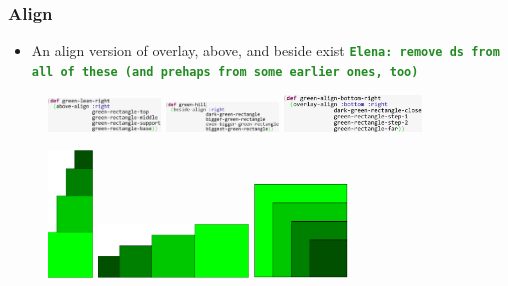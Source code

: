 \documentclass{beamer}
\newcommand{\comment}[1]{{\bf \tt  {#1}}}
\newcommand{\emcomment}[1]{\textcolor{ForestGreen}{\comment{Elena: {#1}}}}
\begin{document}
\begin{frame}
\frametitle{Align}
	\begin{itemize}
		\item An align version of overlay, above, and beside exist \emcomment{remove ds from all of these (and prehaps from some earlier ones, too)}
	\end{itemize}
		\begin{figure}
		\includegraphics[width=3cm]{PresentationImages/greenLeanRightCode.pdf}
		\hspace{0.25cm}
		\includegraphics[width=3cm]{PresentationImages/greenSlopeBottomCode.pdf}
		\hspace{0.25cm}
		\includegraphics[width=3.65cm]{PresentationImages/greenAlignBottomRightCode.pdf}
	\end{figure}

	\begin{figure}
		\includegraphics[width=1.2cm]{PresentationImages/greenLeanRight.png}
		\hspace{1cm} 	\vspace{0.3cm}
		\includegraphics[width=4cm]{PresentationImages/greenSlopeBottom.png}
		\hspace{1cm} 	\vspace{0.3cm}
		\includegraphics[width=2.5cm]{PresentationImages/greenAlignBottomRight.png}
	\end{figure}

\end{frame}
\end{document}
